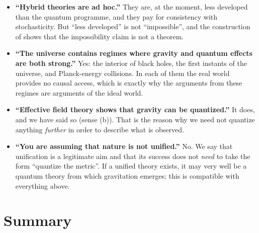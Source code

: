 \begin{itemize}
\item \textbf{``Hybrid theories are ad hoc.''} They are, at the moment, less
  developed than the quantum programme, and they pay for consistency with
  stochasticity. But ``less developed'' is not ``impossible'', and the
  construction of \cite{qg:oppenheim} shows that the impossibility claim
  is not a theorem.
\item \textbf{``The universe contains regimes where gravity and quantum effects are
  both strong.''} Yes: the interior of black holes, the first instants of the
  universe, and Planck-energy collisions. In each of them the real world
  provides no causal access, which is exactly why the arguments from these
  regimes are arguments of the ideal world.
\item \textbf{``Effective field theory shows that gravity can be quantized.''} It does,
  and we have said so (sense (b)). That is the reason why we need not
  quantize anything \emph{further} in order to describe what is observed.
\item \textbf{``You are assuming that nature is not unified.''} No. We say that
  unification is a legitimate aim and that its success does not
  \emph{need} to take the form ``quantize the metric''. If a unified theory
  exists, it may very well be a quantum theory from which gravitation
  emerges; this is compatible with everything above.
\end{itemize}

\section{Summary}

